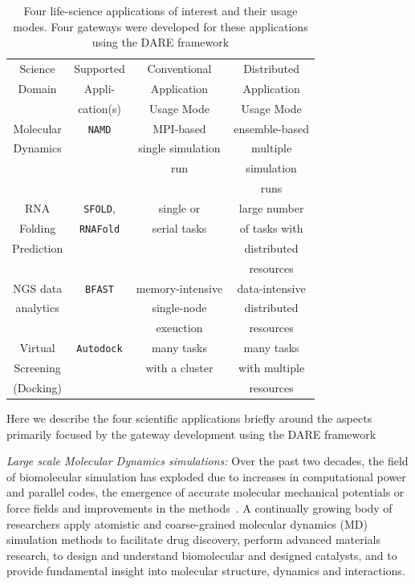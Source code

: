 \documentclass{sig-alternate}
\begin{document}
\begin{table}
 \small
\begin{tabular}{|c|c|c|c|} 
  \hline Science  & Supported  & Conventional   &   Distributed
  \\
  Domain & Appli- & Application & Application \\ 
  &  cation(s) & Usage Mode & Usage Mode \\  \hline \hline 
  
  Molecular   &  \texttt{NAMD} &  MPI-based  & ensemble-based   \\
   Dynamics  &  & single simulation  & multiple  \\ 
   &  & run &  simulation  \\ 
   &  &  &  runs \\ \hline
  RNA   & \texttt{SFOLD}, & single or   & large number  \\
  Folding   & \texttt{RNAFold} & serial tasks & of tasks with   \\
  Prediction & &  &distributed \\
  &  &  &   resources  \\ \hline
  NGS data     &  \texttt{BFAST} & memory-intensive  & data-intensive\\ 
     analytics  &  &  single-node   &  distributed  \\
     & & exeuction  & resources \\ \hline
  Virtual  & \texttt{Autodock} &  many tasks   & many tasks \\
   Screening  &  & with a cluster  & with multiple  \\
    (Docking) &  &  & resources \\ \hline

\hline
\end{tabular} \caption{Four life-science applications of interest and their usage modes.  Four gateways were developed for these applications using the DARE framework}
 \label{table:four-applications} 
\end{table}

Here we describe the four scientific applications briefly around the aspects primarily focused by the gateway development using the DARE framework

\textit{Large scale Molecular Dynamics simulations:} Over the past two
decades, the field of biomolecular simulation has exploded due to
increases in computational power and parallel codes, the emergence of
accurate molecular mechanical potentials or force fields and
improvements in the methods~\cite{amber,mackerell2008,adcock2006}. A
continually growing body of researchers apply atomistic and
coarse-grained molecular dynamics (MD) simulation methods to
facilitate drug discovery, perform advanced materials research, to
design and understand biomolecular and designed catalysts, and to
provide fundamental insight into molecular structure, dynamics and
interactions\cite{meinke2009,mcdowell2006,beck2007}.
\end{document}
